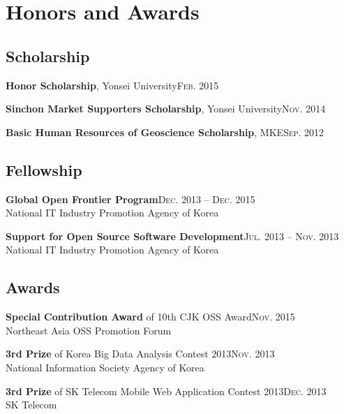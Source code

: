 \documentclass[11pt,a4paper]{article}
\renewenvironment{itemize}{
  \begin{list}{}{
    \setlength{\leftmargin}{1.5em}
    \setlength{\itemsep}{0.5em}
    \setlength{\parskip}{0pt}
    \setlength{\parsep}{0.25em}
  }
}{
  \end{list}
}
\begin{document}
\section*{Honors and Awards}
\subsection*{Scholarship}
\begin{itemize}
	\setlength\itemsep{0.1em}
  \item \textbf{Honor Scholarship}, Yonsei University\hfill\textsc{Feb. 2015}
  \item \textbf{Sinchon Market Supporters Scholarship}, Yonsei University\hfill\textsc{Nov. 2014}
  \item \textbf{Basic Human Resources of Geoscience Scholarship}, MKE\hfill\textsc{Sep. 2012}
\end{itemize}
\subsection*{Fellowship}
\begin{itemize}
  \item \textbf{Global Open Frontier Program}\hfill\textsc{Dec. 2013 -- Dec. 2015}\\
        National IT Industry Promotion Agency of Korea
  \item \textbf{Support for Open Source Software Development}\hfill\textsc{Jul. 2013 -- Nov. 2013}\\
        National IT Industry Promotion Agency of Korea
\end{itemize}
\subsection*{Awards}
\begin{itemize}
  \item \textbf{Special Contribution Award} of 10th CJK OSS Award\hfill\textsc{Nov. 2015}\\
        Northeast Asia OSS Promotion Forum
  \item \textbf{3rd Prize} of Korea Big Data Analysis Contest 2013\hfill\textsc{Nov. 2013}\\
        National Information Society Agency of Korea
  \item \textbf{3rd Prize} of SK Telecom Mobile Web Application Contest 2013\hfill\textsc{Dec. 2013}\\
        SK Telecom
\end{itemize}
\end{document}
